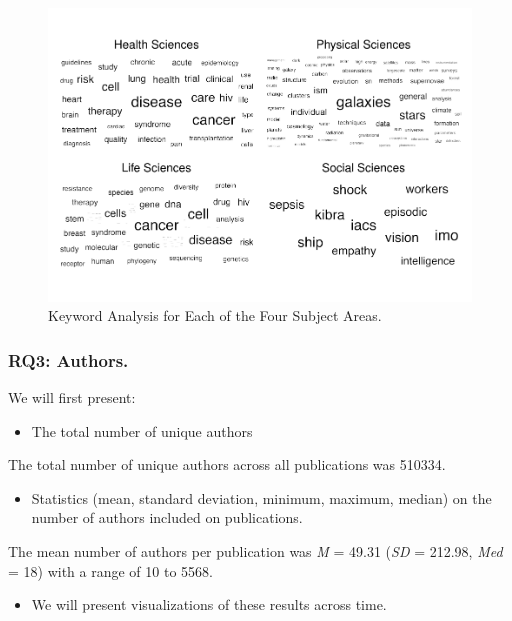 \documentclass[
  man]{apa7}
\providecommand{\tightlist}{%
  \setlength{\itemsep}{0pt}\setlength{\parskip}{0pt}}
\begin{document}
\begin{figure}
\centering
\includegraphics{manuscript_scopus_files/figure-latex/fig-keywords-1.pdf}
\caption{\label{fig:fig-keywords}Keyword Analysis for Each of the Four Subject Areas.}
\end{figure}

\hypertarget{rq3-authors.}{%
\subsubsection{RQ3: Authors.}\label{rq3-authors.}}

We will first present:

\begin{itemize}
\tightlist
\item
  The total number of unique authors
\end{itemize}

The total number of unique authors across all publications was
510334.

\begin{itemize}
\tightlist
\item
  Statistics (mean, standard deviation, minimum, maximum, median) on
  the number of authors included on publications.
\end{itemize}

The mean number of authors per publication was \emph{M} = 49.31
(\emph{SD} = 212.98, \emph{Med} = 18) with a range of
10 to 5568.

\begin{itemize}
\tightlist
\item
  We will present visualizations of these results across time.
\end{itemize}
\end{document}
